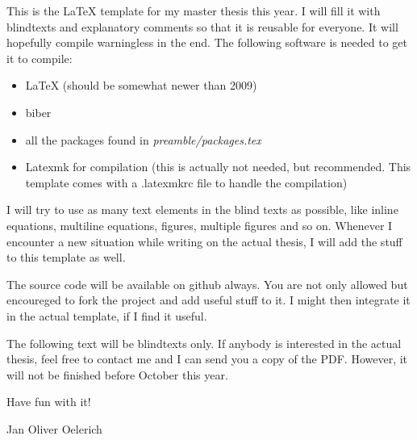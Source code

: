 \label{cha:preface}

\label{sec:introduction}

This is the \LaTeX{} template for my master thesis this year. I will fill
it with blindtexts and explanatory comments so that it is reusable for
everyone. It will hopefully compile warningless in the end. The following
software is needed to get it to compile:
\begin{itemize}
  \item LaTeX (should be somewhat newer than 2009)
  \item biber
  \item all the packages found in \emph{preamble/packages.tex}
  \item Latexmk for compilation (this is actually not needed, but
  recommended. This template comes with a .latexmkrc file to handle the
  compilation) 
\end{itemize}
I will try to use as many text elements in the blind texts as possible,
like inline equations, multiline equations, figures, multiple figures and
so on. Whenever I encounter a new situation while writing on the actual
thesis, I will add the stuff to this template as well.

The source code will be available on github always. You are not only
allowed but encoureged to fork the project and add useful stuff to it. I
might then integrate it in the actual template, if I find it useful.

The following text will be blindtexts only. If anybody is interested in the
actual thesis, feel free to contact me and I can send you a copy of the
PDF. However, it will not be finished before October this year.

\vspace{1cm}

Have fun with it!

\vspace{1cm}

Jan Oliver Oelerich